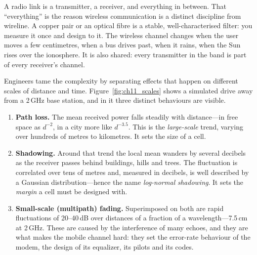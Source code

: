 A radio link is a transmitter, a receiver, and everything in between. That ``everything'' is the
reason wireless communication is a distinct discipline from wireline. A copper pair or an optical
fibre is a stable, well-characterised filter: you measure it once and design to it. The wireless
channel changes when the user moves a few centimetres, when a bus drives past, when it rains,
when the Sun rises over the ionosphere. It is also shared: every transmitter in the band is part
of every receiver's channel.


Engineers tame the complexity by separating effects that happen on different scales of distance
and time. Figure~\ref{fig:ch11_scales} shows a simulated drive away from a 2\,GHz base station,
and in it three distinct behaviours are visible.

\begin{enumerate}
\item \textbf{Path loss.} The mean received power falls steadily with distance---in free space
as $d^{-2}$, in a city more like $d^{-3.5}$. This is the \emph{large-scale} trend, varying over
hundreds of metres to kilometres. It sets the size of a cell.
\item \textbf{Shadowing.} Around that trend the local mean wanders by several decibels as the
receiver passes behind buildings, hills and trees. The fluctuation is correlated over tens of
metres and, measured in decibels, is well described by a Gaussian distribution---hence the
name \emph{log-normal shadowing}. It sets the \emph{margin} a cell must be designed with.
\item \textbf{Small-scale (multipath) fading.} Superimposed on both are rapid fluctuations of
20--40\,dB over distances of a fraction of a wavelength---7.5\,cm at 2\,GHz. These are caused by
the interference of many echoes, and they are what makes the mobile channel hard: they set the
error-rate behaviour of the modem, the design of its equalizer, its pilots and its codes.
\end{enumerate}

